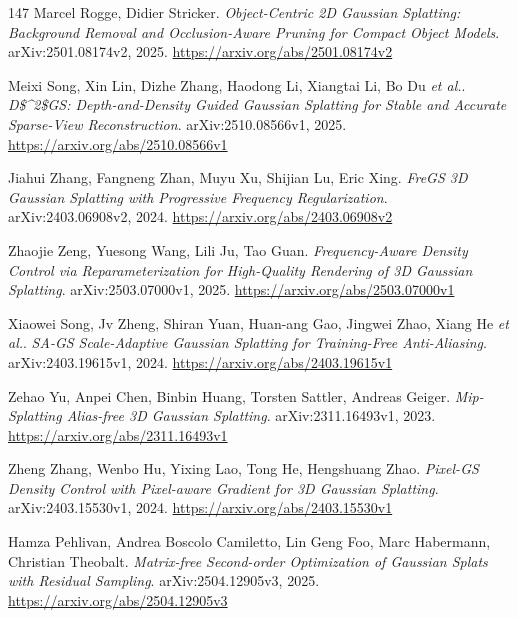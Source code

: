 \documentclass[11pt,a4paper]{article}
\begin{document}
\begin{thebibliography}{147}
Marcel Rogge, Didier Stricker.
\newblock \emph{Object-Centric 2D Gaussian Splatting: Background Removal and Occlusion-Aware Pruning for Compact Object Models}.
\newblock arXiv:2501.08174v2, 2025.
\newblock \url{https://arxiv.org/abs/2501.08174v2}

Meixi Song, Xin Lin, Dizhe Zhang, Haodong Li, Xiangtai Li, Bo Du \emph{et al.}.
\newblock \emph{D\$\textasciicircum{}2\$GS: Depth-and-Density Guided Gaussian Splatting for Stable and Accurate Sparse-View Reconstruction}.
\newblock arXiv:2510.08566v1, 2025.
\newblock \url{https://arxiv.org/abs/2510.08566v1}

Jiahui Zhang, Fangneng Zhan, Muyu Xu, Shijian Lu, Eric Xing.
\newblock \emph{FreGS 3D Gaussian Splatting with Progressive Frequency Regularization}.
\newblock arXiv:2403.06908v2, 2024.
\newblock \url{https://arxiv.org/abs/2403.06908v2}

Zhaojie Zeng, Yuesong Wang, Lili Ju, Tao Guan.
\newblock \emph{Frequency-Aware Density Control via Reparameterization for High-Quality Rendering of 3D Gaussian Splatting}.
\newblock arXiv:2503.07000v1, 2025.
\newblock \url{https://arxiv.org/abs/2503.07000v1}

Xiaowei Song, Jv Zheng, Shiran Yuan, Huan-ang Gao, Jingwei Zhao, Xiang He \emph{et al.}.
\newblock \emph{SA-GS Scale-Adaptive Gaussian Splatting for Training-Free Anti-Aliasing}.
\newblock arXiv:2403.19615v1, 2024.
\newblock \url{https://arxiv.org/abs/2403.19615v1}

Zehao Yu, Anpei Chen, Binbin Huang, Torsten Sattler, Andreas Geiger.
\newblock \emph{Mip-Splatting Alias-free 3D Gaussian Splatting}.
\newblock arXiv:2311.16493v1, 2023.
\newblock \url{https://arxiv.org/abs/2311.16493v1}

Zheng Zhang, Wenbo Hu, Yixing Lao, Tong He, Hengshuang Zhao.
\newblock \emph{Pixel-GS Density Control with Pixel-aware Gradient for 3D Gaussian Splatting}.
\newblock arXiv:2403.15530v1, 2024.
\newblock \url{https://arxiv.org/abs/2403.15530v1}

Hamza Pehlivan, Andrea Boscolo Camiletto, Lin Geng Foo, Marc Habermann, Christian Theobalt.
\newblock \emph{Matrix-free Second-order Optimization of Gaussian Splats with Residual Sampling}.
\newblock arXiv:2504.12905v3, 2025.
\newblock \url{https://arxiv.org/abs/2504.12905v3}


\end{thebibliography}
\end{document}
